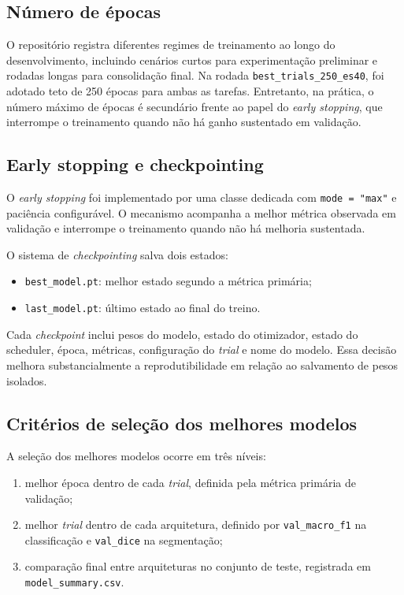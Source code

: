 \documentclass[tcc,capa]{texufpel}
\begin{document}
\subsection{Número de épocas}

O repositório registra diferentes regimes de treinamento ao longo do desenvolvimento, incluindo cenários curtos para experimentação preliminar e rodadas longas para consolidação final. Na rodada \texttt{best\_trials\_250\_es40}, foi adotado teto de 250 épocas para ambas as tarefas. Entretanto, na prática, o número máximo de épocas é secundário frente ao papel do \textit{early stopping}, que interrompe o treinamento quando não há ganho sustentado em validação.

\subsection{Early stopping e checkpointing}

O \textit{early stopping} foi implementado por uma classe dedicada com \texttt{mode = "max"} e paciência configurável. O mecanismo acompanha a melhor métrica observada em validação e interrompe o treinamento quando não há melhoria sustentada.

O sistema de \textit{checkpointing} salva dois estados:
\begin{itemize}
	\item \texttt{best\_model.pt}: melhor estado segundo a métrica primária;
	\item \texttt{last\_model.pt}: último estado ao final do treino.
\end{itemize}

Cada \textit{checkpoint} inclui pesos do modelo, estado do otimizador, estado do scheduler, época, métricas, configuração do \textit{trial} e nome do modelo. Essa decisão melhora substancialmente a reprodutibilidade em relação ao salvamento de pesos isolados.

\subsection{Critérios de seleção dos melhores modelos}

A seleção dos melhores modelos ocorre em três níveis:
\begin{enumerate}
	\item melhor época dentro de cada \textit{trial}, definida pela métrica primária de validação;
	\item melhor \textit{trial} dentro de cada arquitetura, definido por \texttt{val\_macro\_f1} na classificação e \texttt{val\_dice} na segmentação;
	\item comparação final entre arquiteturas no conjunto de teste, registrada em \texttt{model\_summary.csv}.
\end{enumerate}
\end{document}
